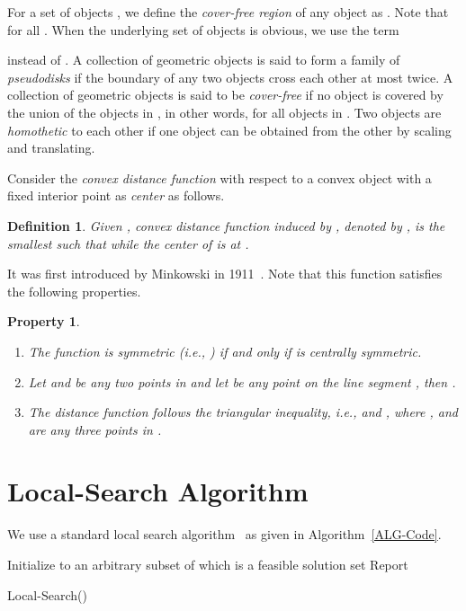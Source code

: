 \documentclass[a4paper,11pt]{article}
\newtheorem{definition}{Definition}
\newtheorem{property}{Property}
\begin{document}
For a   set of objects ,  we define the 
\emph{cover-free region} of any object   as . Note that  for all 
. When the  {underlying} set of objects  is obvious, we use the term 
 
instead of .
A collection of geometric objects 
is said to form a family of \emph{pseudodisks} if the boundary of any two 
objects cross each other at most twice.  A collection of  geometric 
objects  is said to be \emph{cover-free}
 if no object  is covered by the union of the objects in , in other words,  for all  
objects in . 
  Two objects  are \emph{homothetic} to each other if one object can be 
obtained from the other by scaling and translating. 



 Consider the \emph{convex distance function} with respect to a convex object  with a fixed interior point as \emph{center} as follows.

\begin{definition}\label{def_1_cd}
 Given , \emph{convex distance function} induced by , denoted by , is the smallest  such that  while  the center of  is at . 
\end{definition}
 It was first introduced by Minkowski in 1911~\cite{KelleyN, ChewD85}. Note that this function satisfies the following  properties.

\begin{property}
\label{prop:convex_dist}
\begin{enumerate}[label=(\roman*)]
\item The function   is symmetric (i.e., ) if and only if  is centrally symmetric.
\item Let   and  be any two points in  and let  be 
any point 
on the line segment , then   .
\item The distance function  follows 
the triangular inequality, i.e.,  and , where  ,  and 
  are any three points in .
\end{enumerate}
\end{property}



\section{Local-Search Algorithm}
\label{S-Alg}
We use a  standard local search algorithm~\cite{MustafaR10} as 
given in Algorithm~\ref{ALG-Code}.

\begin{algorithm}[h]
 \SetAlgoLined
\small
{}
Initialize  to an arbitrary  subset of  which is a 
feasible solution\;
{
set \;
}
Report \;
\normalsize
 \caption{Local-Search()}
\label{ALG-Code}
\end{algorithm}
\end{document}
